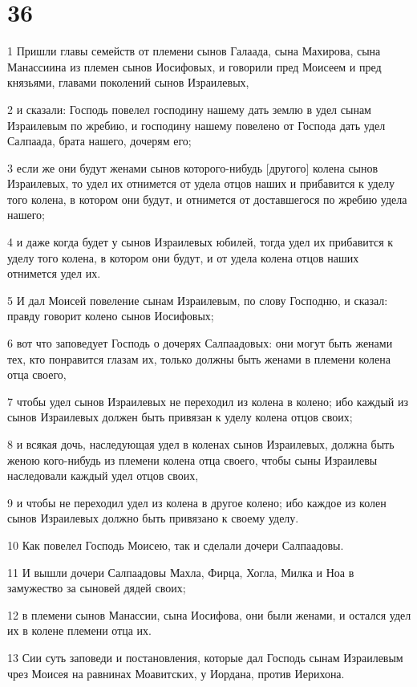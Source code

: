 \chapter{36}

\par 1 Пришли главы семейств от племени сынов Галаада, сына Махирова, сына Манассиина из племен сынов Иосифовых, и говорили пред Моисеем и пред князьями, главами поколений сынов Израилевых,
\par 2 и сказали: Господь повелел господину нашему дать землю в удел сынам Израилевым по жребию, и господину нашему повелено от Господа дать удел Салпаада, брата нашего, дочерям его;
\par 3 если же они будут женами сынов которого-нибудь [другого] колена сынов Израилевых, то удел их отнимется от удела отцов наших и прибавится к уделу того колена, в котором они будут, и отнимется от доставшегося по жребию удела нашего;
\par 4 и даже когда будет у сынов Израилевых юбилей, тогда удел их прибавится к уделу того колена, в котором они будут, и от удела колена отцов наших отнимется удел их.
\par 5 И дал Моисей повеление сынам Израилевым, по слову Господню, и сказал: правду говорит колено сынов Иосифовых;
\par 6 вот что заповедует Господь о дочерях Салпаадовых: они могут быть женами тех, кто понравится глазам их, только должны быть женами в племени колена отца своего,
\par 7 чтобы удел сынов Израилевых не переходил из колена в колено; ибо каждый из сынов Израилевых должен быть привязан к уделу колена отцов своих;
\par 8 и всякая дочь, наследующая удел в коленах сынов Израилевых, должна быть женою кого-нибудь из племени колена отца своего, чтобы сыны Израилевы наследовали каждый удел отцов своих,
\par 9 и чтобы не переходил удел из колена в другое колено; ибо каждое из колен сынов Израилевых должно быть привязано к своему уделу.
\par 10 Как повелел Господь Моисею, так и сделали дочери Салпаадовы.
\par 11 И вышли дочери Салпаадовы Махла, Фирца, Хогла, Милка и Ноа в замужество за сыновей дядей своих;
\par 12 в племени сынов Манассии, сына Иосифова, они были женами, и остался удел их в колене племени отца их.
\par 13 Сии суть заповеди и постановления, которые дал Господь сынам Израилевым чрез Моисея на равнинах Моавитских, у Иордана, против Иерихона.


